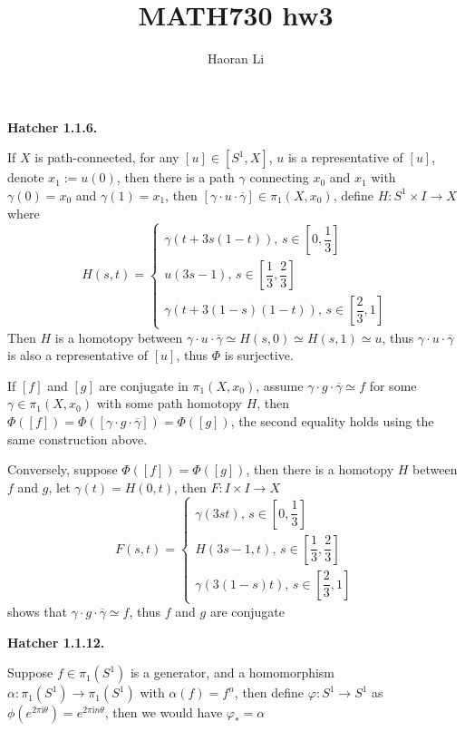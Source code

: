 \documentclass[12pt]{article}
\title{MATH730 hw3}
\author{Haoran Li}
\date{}
\begin{document}
\maketitle
\textbf{Hatcher 1.1.6.} \par
If $X$ is path-connected, for any $[u]\in [S^{1},X]$, $u$ is a representative of $[u]$, denote $x_{1}:=u(0)$, then there is a path $\gamma$ connecting $x_{0}$ and $x_{1}$ with $\gamma(0)=x_{0}$ and $\gamma(1)=x_{1}$, then $[\gamma\cdot u\cdot\overline{\gamma}]\in \pi_{1}(X,x_{0})$, define $H:S^{1}\times I\rightarrow X$ where
\[
H(s,t)=\left\{\begin{matrix}
\gamma\left( t+3s(1-t) \right), \, s\in[0,\dfrac{1}{3}]\\ 
u(3s-1), \, s\in[\dfrac{1}{3},\dfrac{2}{3}]\\ 
\gamma\left( t+3(1-s)(1-t) \right), \, s\in[\dfrac{2}{3},1]
\end{matrix}\right.
\]
Then $H$ is a homotopy between $\gamma\cdot u\cdot\overline{\gamma}\simeq H(s,0)\simeq H(s,1)\simeq u$, thus $\gamma\cdot u\cdot\overline{\gamma}$ is also a representative of $[u]$, thus $\Phi$ is surjective. \par
If $[f]$ and $[g]$ are conjugate in $\pi_{1}(X,x_{0})$, assume $\gamma\cdot g\cdot\overline{\gamma} \simeq f$ for some $\gamma\in\pi_{1}(X,x_{0})$ with some path homotopy $H$, then $\Phi([f])=\Phi([\gamma\cdot g\cdot\overline{\gamma}])=\Phi([g])$, the second equality holds using the same construction above. \par
Conversely, suppose $\Phi([f])=\Phi([g])$, then there is a homotopy $H$ between $f$ and $g$, let $\gamma(t) = H(0,t)$, then $F:I\times I\rightarrow X$
\[
F(s,t)=\left\{\begin{matrix}
\gamma\left(3st\right), \, s\in[0,\dfrac{1}{3}]\\ 
H\left(3s-1,t\right), \, s\in[\dfrac{1}{3},\dfrac{2}{3}]\\ 
\gamma\left(3(1-s)t\right), \, s\in[\dfrac{2}{3},1]
\end{matrix}\right.
\]
shows that $
\gamma\cdot g\cdot\overline{\gamma} \simeq f$, thus $f$ and $g$ are conjugate \par
\textbf{Hatcher 1.1.12.} \par
Suppose $f\in \pi_{1}(S^{1})$ is a generator, and a homomorphism $\alpha: \pi_{1}(S^{1})\rightarrow \pi_{1}(S^{1})$  with $\alpha(f)=f^{n}$, then define $\varphi: S^{1}\rightarrow S^{1}$ as $\phi(e^{2\pi \mathrm{i}\theta}) = e^{2\pi \mathrm{i}n\theta}$, then we would have $\varphi_{*}=\alpha$ \par
\end{document}
